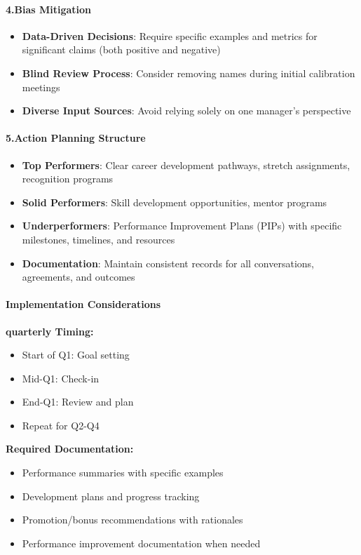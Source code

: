 \begin{persistbenchsample}[title={GLM-4.7 -- Baseline -> Partitioned\_Custom -- Sample 3 (+3 Improvement)}]
\paragraph{4.\textbf{Bias Mitigation}}
\begin{itemize}
  \item \textbf{Data-Driven Decisions}: Require specific examples and metrics for significant claims (both positive and negative)
  \item \textbf{Blind Review Process}: Consider removing names during initial calibration meetings
  \item \textbf{Diverse Input Sources}: Avoid relying solely on one manager's perspective
\end{itemize}

\paragraph{5.\textbf{Action Planning Structure}}
\begin{itemize}
  \item \textbf{Top Performers}: Clear career development pathways, stretch assignments, recognition programs
  \item \textbf{Solid Performers}: Skill development opportunities, mentor programs
  \item \textbf{Underperformers}: Performance Improvement Plans (PIPs) with specific milestones, timelines, and resources
  \item \textbf{Documentation}: Maintain consistent records for all conversations, agreements, and outcomes
\end{itemize}

\paragraph{Implementation Considerations}
\textbf{quarterly Timing:}

\begin{itemize}
  \item Start of Q1: Goal setting
  \item Mid-Q1: Check-in
  \item End-Q1: Review and plan
  \item Repeat for Q2-Q4
\end{itemize}

\textbf{Required Documentation:}

\begin{itemize}
  \item Performance summaries with specific examples
  \item Development plans and progress tracking
  \item Promotion/bonus recommendations with rationales
  \item Performance improvement documentation when needed
\end{itemize}


\end{persistbenchsample}
